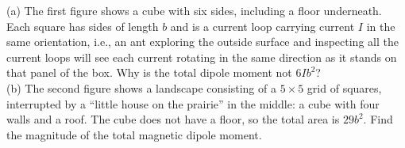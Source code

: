 (a) The first figure shows a cube with six sides, including a floor
underneath.  Each square has sides of length $b$ and is a current loop
carrying current $I$ in the same orientation, i.e., an ant exploring
the outside surface and inspecting all the current loops will see each
current rotating in the same direction as it stands on that panel of
the box. Why is the total dipole moment not $6Ib^2$?\\
%
(b) The second figure shows a landscape consisting of a $5\times5$
grid of squares, interrupted by a ``little house on the prairie'' in
the middle: a cube with four walls and a roof. The cube does not have
a floor, so the total area is $29b^2$. Find the magnitude of the total
magnetic dipole moment.\answercheck
%

